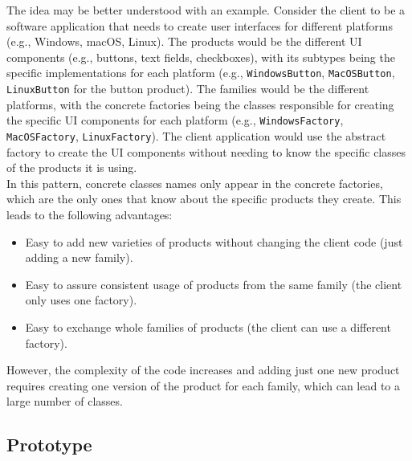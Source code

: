The idea may be better understood with an example. Consider the client to be a software application that needs to create user interfaces for different platforms (e.g., Windows, macOS, Linux). The products would be the different UI components (e.g., buttons, text fields, checkboxes), with its subtypes being the specific implementations for each platform (e.g., \texttt{WindowsButton}, \texttt{MacOSButton}, \texttt{LinuxButton} for the button product). The families would be the different platforms, with the concrete factories being the classes responsible for creating the specific UI components for each platform (e.g., \texttt{WindowsFactory}, \texttt{MacOSFactory}, \texttt{LinuxFactory}). The client application would use the abstract factory to create the UI components without needing to know the specific classes of the products it is using.\\

In this pattern, concrete classes names only appear in the concrete factories, which are the only ones that know about the specific products they create. This leads to the following advantages:
\begin{itemize}
    \item Easy to add new varieties of products without changing the client code (just adding a new family).
    \item Easy to assure consistent usage of products from the same family (the client only uses one factory).
    \item Easy to exchange whole families of products (the client can use a different factory).
\end{itemize}

However, the complexity of the code increases and adding just one new product requires creating one version of the product for each family, which can lead to a large number of classes.

\subsection{Prototype}

